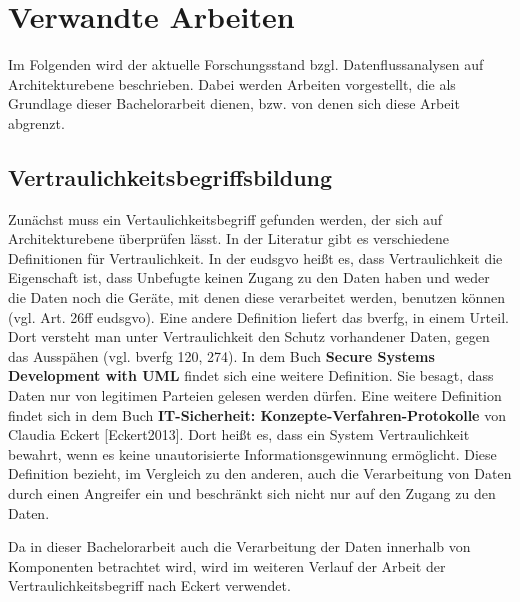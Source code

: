 
\chapter{Verwandte Arbeiten}
\label{ch:verwandteArbeiten}

Im Folgenden wird der aktuelle Forschungsstand bzgl. Datenflussanalysen auf Architekturebene beschrieben. Dabei werden Arbeiten vorgestellt, die als Grundlage dieser Bachelorarbeit dienen, bzw. von denen sich diese Arbeit abgrenzt. 

\section{Vertraulichkeitsbegriffsbildung}
\label{sec:vertraulichkeit}
Zunächst muss ein Vertaulichkeitsbegriff gefunden werden, der sich auf Architekturebene überprüfen lässt.
In der Literatur gibt es verschiedene Definitionen für Vertraulichkeit. In der \gls{eudsgvo} heißt es, dass Vertraulichkeit die Eigenschaft ist, dass Unbefugte keinen Zugang zu den Daten haben und weder die Daten noch die Geräte, mit denen diese verarbeitet werden, benutzen können (vgl. Art. 26ff \gls{eudsgvo}). 
Eine andere Definition liefert das \gls{bverfg}, in einem Urteil. Dort versteht man unter Vertraulichkeit den Schutz vorhandener Daten, gegen das Ausspähen (vgl. \gls{bverfg} 120, 274). In dem Buch \textbf{Secure Systems Development with UML} \cite{Jurjens2005} findet sich eine weitere Definition. Sie besagt, dass Daten nur von legitimen Parteien gelesen werden dürfen.
Eine weitere Definition findet sich in dem Buch \textbf{IT-Sicherheit: Konzepte-Verfahren-Protokolle} von Claudia Eckert [Eckert2013]. Dort heißt es, dass ein System Vertraulichkeit bewahrt, wenn es keine unautorisierte Informationsgewinnung ermöglicht. Diese Definition bezieht, im Vergleich zu den anderen, auch die Verarbeitung von Daten durch einen Angreifer ein und beschränkt sich nicht nur auf den Zugang zu den Daten. \par
Da in dieser Bachelorarbeit auch die Verarbeitung der Daten innerhalb von Komponenten betrachtet wird, wird im weiteren Verlauf der Arbeit der Vertraulichkeitsbegriff nach Eckert verwendet. %

